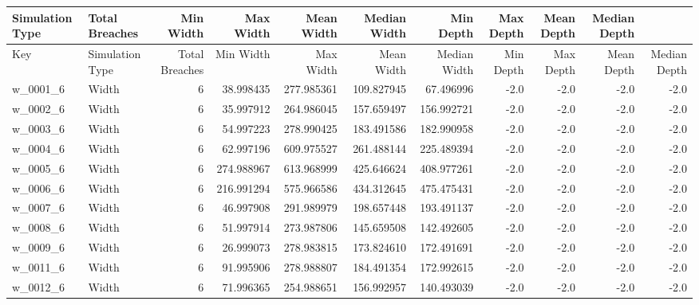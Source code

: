 \begin{tabular}{llrrrrrrrrr}
\toprule\textbf{Simulation Type} & \textbf{Total Breaches} & \textbf{Min Width} & \textbf{Max Width} & \textbf{Mean Width} & \textbf{Median Width} & \textbf{Min Depth} & \textbf{Max Depth} & \textbf{Mean Depth} & \textbf{Median Depth}\\ \midrule
     Key & Simulation Type &  Total Breaches &  Min Width &  Max Width &  Mean Width &  Median Width &  Min Depth &  Max Depth &  Mean Depth &  Median Depth \\
\midrule
w_0001_6 &           Width &               6 &  38.998435 & 277.985361 &  109.827945 &     67.496996 &       -2.0 &       -2.0 &        -2.0 &          -2.0 \\
w_0002_6 &           Width &               6 &  35.997912 & 264.986045 &  157.659497 &    156.992721 &       -2.0 &       -2.0 &        -2.0 &          -2.0 \\
w_0003_6 &           Width &               6 &  54.997223 & 278.990425 &  183.491586 &    182.990958 &       -2.0 &       -2.0 &        -2.0 &          -2.0 \\
w_0004_6 &           Width &               6 &  62.997196 & 609.975527 &  261.488144 &    225.489394 &       -2.0 &       -2.0 &        -2.0 &          -2.0 \\
w_0005_6 &           Width &               6 & 274.988967 & 613.968999 &  425.646624 &    408.977261 &       -2.0 &       -2.0 &        -2.0 &          -2.0 \\
w_0006_6 &           Width &               6 & 216.991294 & 575.966586 &  434.312645 &    475.475431 &       -2.0 &       -2.0 &        -2.0 &          -2.0 \\
w_0007_6 &           Width &               6 &  46.997908 & 291.989979 &  198.657448 &    193.491137 &       -2.0 &       -2.0 &        -2.0 &          -2.0 \\
w_0008_6 &           Width &               6 &  51.997914 & 273.987806 &  145.659508 &    142.492605 &       -2.0 &       -2.0 &        -2.0 &          -2.0 \\
w_0009_6 &           Width &               6 &  26.999073 & 278.983815 &  173.824610 &    172.491691 &       -2.0 &       -2.0 &        -2.0 &          -2.0 \\
w_0011_6 &           Width &               6 &  91.995906 & 278.988807 &  184.491354 &    172.992615 &       -2.0 &       -2.0 &        -2.0 &          -2.0 \\
w_0012_6 &           Width &               6 &  71.996365 & 254.988651 &  156.992957 &    140.493039 &       -2.0 &       -2.0 &        -2.0 &          -2.0 \\

\end{tabular}
